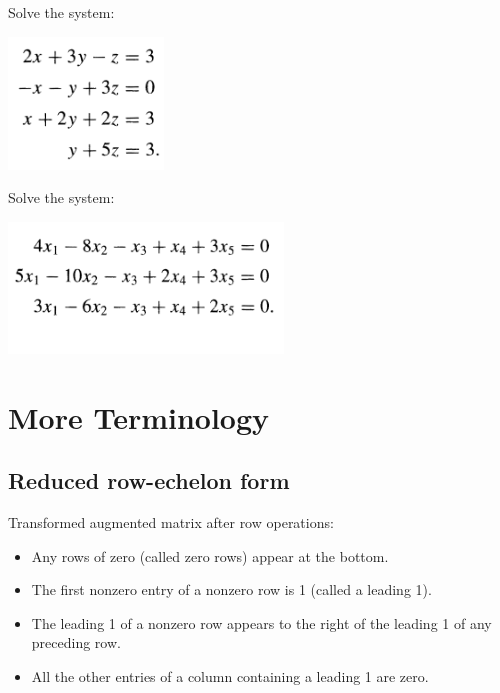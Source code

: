 \documentclass[12pt,a4paper]{article}
\newcounter{example}[section]
\begin{document}
\newpage

\begin{example}
Solve the system: 
	\begin{center}
	\includegraphics[scale=0.65]{example3-book.png}
	\end{center}		
\end{example}

\newpage

\begin{example}
Solve the system:
	\begin{center}
	\includegraphics[scale=0.65]{example4-book.png}
	\end{center}
\vspace*{-0.75cm}
\end{example}

\newpage

\section{More Terminology}

\subsection{Reduced row-echelon form}
Transformed augmented matrix after row operations:
	\begin{itemize}
	\item Any rows of zero (called zero rows) appear at the bottom.
	\item The first nonzero entry of a nonzero row is 1 (called a leading 1).
	\item The leading 1 of a nonzero row appears to the right of the leading 1 of any preceding row.
	\item All the other entries of a column containing a leading 1 are zero.
	\end{itemize}
\end{document}
